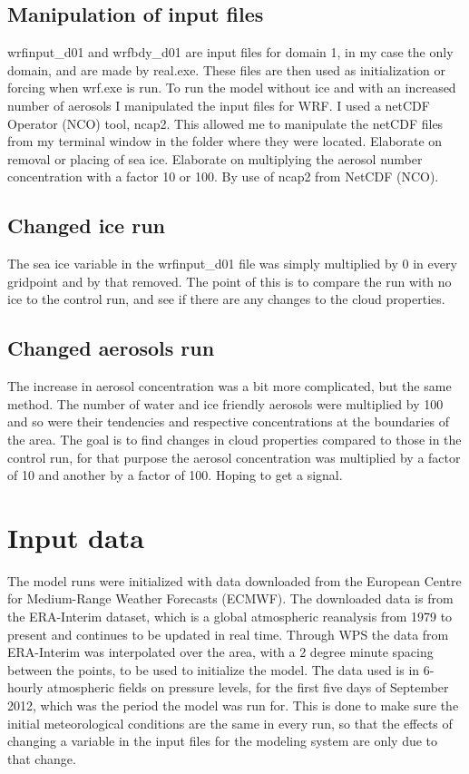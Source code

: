 \subsection{Manipulation of input files}
wrfinput\_d01 and wrfbdy\_d01 are input files for domain 1, in my case the only domain, and are made by real.exe. These files are then used as initialization or forcing when wrf.exe is run.
To run the model without ice and with an increased number of aerosols I manipulated the input files for WRF. I used a netCDF Operator (NCO) tool, ncap2. This allowed me to manipulate the netCDF files from my terminal window in the folder where they were located.
Elaborate on removal or placing of sea ice. Elaborate on multiplying the aerosol number concentration with a factor 10 or 100. By use of ncap2 from NetCDF (NCO).

\subsection{Changed ice run}
The sea ice variable in the wrfinput\_d01 file was simply multiplied by 0 in every gridpoint and by that removed.
The point of this is to compare the run with no ice to the control run, and see if there are any changes to the cloud properties.

\subsection{Changed aerosols run}
The increase in aerosol concentration was a bit more complicated, but the same method. The number of water and ice friendly aerosols were multiplied by 100 and so were their tendencies and respective concentrations at the boundaries of the area. %
The goal is to find changes in cloud properties compared to those in the control run, for that purpose the aerosol concentration was multiplied by a factor of 10 and another by a factor of 100. Hoping to get a signal.

\section{Input data}
\label{sec:inputdata}
The model runs were initialized with data downloaded from the European Centre for Medium-Range Weather Forecasts (ECMWF).%
The downloaded data is from the ERA-Interim dataset, which is a global atmospheric reanalysis from 1979 to present and continues to be updated in real time.%
Through WPS the data from ERA-Interim was interpolated over the area, with a 2 degree minute spacing between the points, to be used to initialize the model. The data used is in 6-hourly atmospheric fields on pressure levels, for the first five days of September 2012, which was the period the model was run for. This is done to make sure the initial meteorological conditions are the same in every run, so that the effects of changing a variable in the input files for the modeling system are only due to that change.

